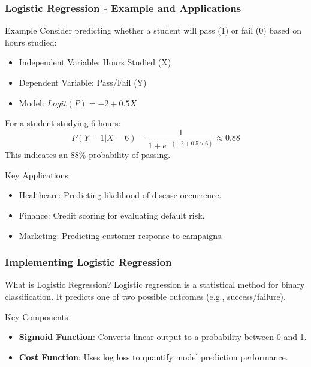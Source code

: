 \documentclass[aspectratio=169]{beamer}
\begin{document}
\begin{frame}[fragile]
  \frametitle{Logistic Regression - Example and Applications}
  \begin{block}{Example}
    Consider predicting whether a student will pass (1) or fail (0) based on hours studied:
    \begin{itemize}
      \item Independent Variable: Hours Studied (X)
      \item Dependent Variable: Pass/Fail (Y)
      \item Model: \(Logit(P) = -2 + 0.5X\)
    \end{itemize}
    For a student studying 6 hours:
    \begin{equation}
      P(Y=1|X=6) = \frac{1}{1 + e^{-(-2 + 0.5 \times 6)}} \approx 0.88
    \end{equation}
    This indicates an 88\% probability of passing.
  \end{block}

  \begin{block}{Key Applications}
    \begin{itemize}
      \item Healthcare: Predicting likelihood of disease occurrence.
      \item Finance: Credit scoring for evaluating default risk.
      \item Marketing: Predicting customer response to campaigns.
    \end{itemize}
  \end{block}
\end{frame}

\begin{frame}[fragile]
    \frametitle{Implementing Logistic Regression}
    
    \begin{block}{What is Logistic Regression?}
        Logistic regression is a statistical method for binary classification. It predicts one of two possible outcomes (e.g., success/failure).
    \end{block}
    
    \begin{block}{Key Components}
        \begin{itemize}
            \item \textbf{Sigmoid Function}: Converts linear output to a probability between 0 and 1.
            \item \textbf{Cost Function}: Uses log loss to quantify model prediction performance.
        \end{itemize}
    \end{block}
\end{frame}
\end{document}
